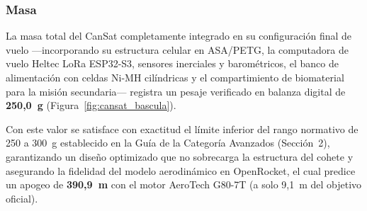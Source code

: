 
\subsubsection{Masa}
La masa total del CanSat completamente integrado en su configuración final de vuelo ---incorporando su estructura celular en ASA/PETG, la computadora de vuelo Heltec LoRa ESP32-S3, sensores inerciales y barométricos, el banco de alimentación con celdas Ni-MH cilíndricas y el compartimiento de biomaterial para la misión secundaria--- registra un pesaje verificado en balanza digital de \textbf{250,0~g} (Figura~\ref{fig:cansat_bascula}).

Con este valor se satisface con exactitud el límite inferior del rango normativo de 250 a 300~g establecido en la Guía de la Categoría Avanzados (Sección~2), garantizando un diseño optimizado que no sobrecarga la estructura del cohete y asegurando la fidelidad del modelo aerodinámico en OpenRocket, el cual predice un apogeo de \textbf{390,9~m} con el motor AeroTech G80-7T (a solo 9,1~m del objetivo oficial).

